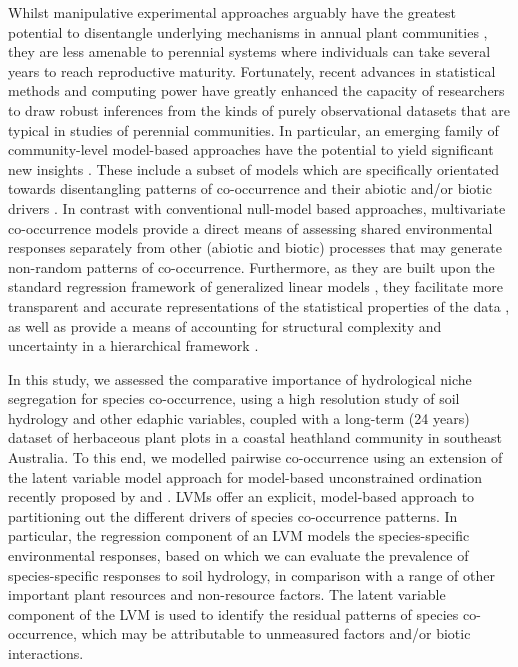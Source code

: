 Whilst manipulative experimental approaches arguably have the greatest potential to disentangle underlying mechanisms in annual plant communities \citep[e.g.][]{Sears2007a, Godoy2014}, they are less amenable to perennial systems where individuals can take several years to reach reproductive maturity. Fortunately, recent advances in statistical methods and computing power have greatly enhanced the capacity of researchers to draw robust inferences from the kinds of purely observational datasets that are typical in studies of perennial communities. In particular, an emerging family of community-level model-based approaches have the potential to yield significant new insights \citep{FERRIER2006, Warton2014}. These include a subset of models which are specifically orientated towards disentangling patterns of co-occurrence and their abiotic and/or biotic drivers \citep{Ovaskainen2010, Pollock2014, Harris2015}. In contrast with conventional null-model based approaches, multivariate co-occurrence models \citep[also known as Joint Species Distribution Models (JSDM), after][]{Clark2013} provide a direct means of assessing shared environmental responses separately from other (abiotic and biotic) processes that may generate non-random patterns of co-occurrence. Furthermore, as they are built upon the standard regression framework of generalized linear models \citep{mccullough1989}, they facilitate more transparent and accurate representations of the statistical properties of the data \citep[e.g. overdispersion of counts,][]{Warton2012}, as well as provide a means of accounting for structural complexity and uncertainty in a hierarchical framework \citep{Cressie2009}.

In this study, we assessed the comparative importance of hydrological niche segregation for species co-occurrence, using a high resolution study of soil hydrology and other edaphic variables, coupled with a long-term (24 years) dataset of herbaceous plant plots in a coastal heathland community in southeast Australia. To this end, we modelled pairwise co-occurrence using an extension of the latent variable model \citep[LVM,][]{Skrondal2004} approach for model-based unconstrained ordination recently proposed by \citet{Walker2011} and \citet{Hui2014}. LVMs offer an explicit, model-based approach to partitioning out the different drivers of species co-occurrence patterns. In particular, the regression component of an LVM models the species-specific environmental responses, based on which we can evaluate the prevalence of species-specific responses to soil hydrology, in comparison with a range of other important plant resources and non-resource factors. The latent variable component of the LVM is used to identify the residual patterns of species co-occurrence, which may be attributable to unmeasured factors and/or biotic interactions.

